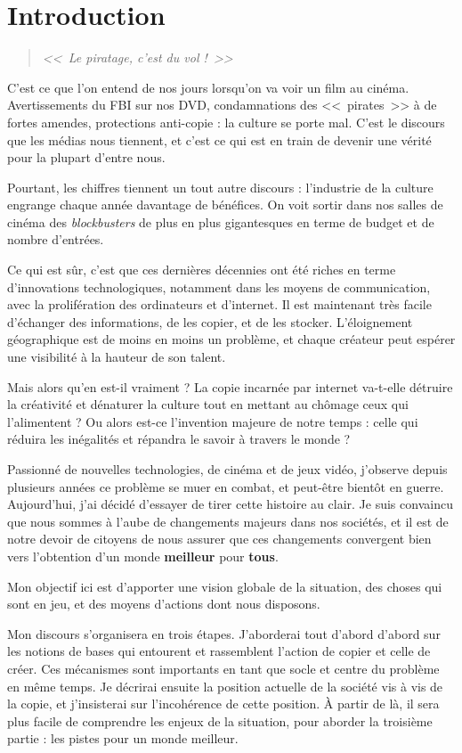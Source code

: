 \chapter*{Introduction}

\begin{quote}
{\Large \textit{<<~Le piratage, c'est du vol !~>>}}
\end{quote}

C'est ce que l'on entend de nos jours lorsqu'on va voir un film au cinéma.
Avertissements du FBI sur nos DVD, condamnations des <<~pirates~>> à de fortes amendes, protections anti-copie : la culture se porte mal.
C'est le discours que les médias nous tiennent, et c'est ce qui est en train de devenir une vérité pour la plupart d'entre nous.

Pourtant, les chiffres tiennent un tout autre discours : l'industrie de la culture engrange chaque année davantage de bénéfices.
On voit sortir dans nos salles de cinéma des \textit{blockbusters} de plus en plus gigantesques en terme de budget et de nombre d'entrées.

Ce qui est sûr, c'est que ces dernières décennies ont été riches en terme d'innovations technologiques, notamment dans les moyens de communication, avec la prolifération des ordinateurs et d'internet.
Il est maintenant très facile d'échanger des informations, de les copier, et de les stocker.
L'éloignement géographique est de moins en moins un problème, et chaque créateur peut espérer une visibilité à la hauteur de son talent.

Mais alors qu'en est-il vraiment ?
La copie incarnée par internet va-t-elle détruire la créativité et dénaturer la culture tout en mettant au chômage ceux qui l'alimentent ?
Ou alors est-ce l'invention majeure de notre temps : celle qui réduira les inégalités et répandra le savoir à travers le monde ?

Passionné de nouvelles technologies, de cinéma et de jeux vidéo, j'observe depuis plusieurs années ce problème se muer en combat, et peut-être bientôt en guerre.
Aujourd'hui, j'ai décidé d'essayer de tirer cette histoire au clair.
Je suis convaincu que nous sommes à l'aube de changements majeurs dans nos sociétés, et il est de notre devoir de citoyens de nous assurer que ces changements convergent bien vers l'obtention d'un monde \textbf{meilleur} pour \textbf{tous}.

Mon objectif ici est d'apporter une vision globale de la situation, des choses qui sont en jeu, et des moyens d'actions dont nous disposons.

Mon discours s'organisera en trois étapes.
J'aborderai tout d'abord d'abord sur les notions de bases qui entourent et rassemblent l'action de copier et celle de créer.
Ces mécanismes sont importants en tant que socle et centre du problème en même temps.
Je décrirai ensuite la position actuelle de la société vis à vis de la copie, et j'insisterai sur l'incohérence de cette position.
À partir de là, il sera plus facile de comprendre les enjeux de la situation, pour aborder la troisième partie : les pistes pour un monde meilleur.
